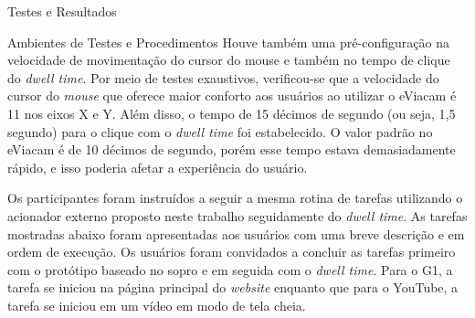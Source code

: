 \begin{chapter}{Testes e Resultados}
\begin{section}{Ambientes de Testes e Procedimentos}
Houve também uma pré-configuração na velocidade de movimentação do cursor do
mouse e também no tempo de clique do \textit{dwell time}. Por meio de testes
exaustivos, verificou-se que a velocidade do cursor do \textit{mouse} que
oferece maior conforto aos usuários ao utilizar o eViacam é 11 nos eixos X e Y.
Além disso, o tempo de 15 décimos de segundo (ou seja, 1,5 segundo) para o
clique com o \textit{dwell time} foi estabelecido. O valor padrão no eViacam é
de 10 décimos de segundo, porém esse tempo estava demasiadamente rápido, e isso
poderia afetar a experiência do usuário.

Os participantes foram instruídos a seguir a mesma rotina de tarefas utilizando
o acionador externo proposto neste trabalho seguidamente do \textit{dwell
time}. As tarefas mostradas abaixo foram apresentadas aos usuários com uma breve
descrição e em ordem de execução. Os usuários foram convidados a concluir as
tarefas primeiro com o protótipo baseado no sopro e em seguida com o
\textit{dwell time}.  Para o G1, a tarefa se iniciou na página
principal do \textit{website} enquanto que para o YouTube, a tarefa se iniciou
em um vídeo em modo de tela cheia.


\end{section}
\end{chapter}
